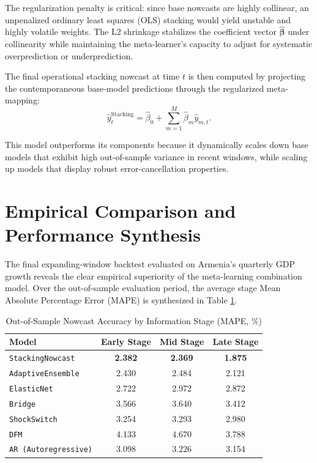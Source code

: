 \documentclass[12pt,a4paper]{article}
\begin{document}
The regularization penalty is critical: since base nowcasts are highly collinear, an unpenalized ordinary least squares (OLS) stacking would yield unstable and highly volatile weights. The L2 shrinkage stabilizes the coefficient vector $\hat{\bm{\beta}}$ under collinearity while maintaining the meta-learner's capacity to adjust for systematic overprediction or underprediction.

The final operational stacking nowcast at time $t$ is then computed by projecting the contemporaneous base-model predictions through the regularized meta-mapping:
\begin{equation}
    \hat{y}_{t}^{\text{Stacking}} = \hat{\beta}_0 + \sum_{m=1}^{M} \hat{\beta}_m \hat{y}_{m,t}.
\end{equation}

This model outperforms its components because it dynamically scales down base models that exhibit high out-of-sample variance in recent windows, while scaling up models that display robust error-cancellation properties.

\section{Empirical Comparison and Performance Synthesis}

The final expanding-window backtest evaluated on Armenia's quarterly GDP growth reveals the clear empirical superiority of the meta-learning combination model. Over the out-of-sample evaluation period, the average stage Mean Absolute Percentage Error (MAPE) is synthesized in Table \ref{tab:mape_comparison}.

\begin{table}[h]
    \centering
    \caption{Out-of-Sample Nowcast Accuracy by Information Stage (MAPE, \%)}
    \label{tab:mape_comparison}
    \begin{tabular}{lccc}
        \toprule
        Model & Early Stage & Mid Stage & Late Stage \\
        \midrule
        \texttt{StackingNowcast} & \textbf{2.382} & \textbf{2.369} & \textbf{1.875} \\
        \texttt{AdaptiveEnsemble} & 2.430 & 2.484 & 2.121 \\
        \texttt{ElasticNet} & 2.722 & 2.972 & 2.872 \\
        \texttt{Bridge} & 3.566 & 3.640 & 3.412 \\
        \texttt{ShockSwitch} & 3.254 & 3.293 & 2.980 \\
        \texttt{DFM} & 4.133 & 4.670 & 3.788 \\
        \texttt{AR (Autoregressive)} & 3.098 & 3.226 & 3.154 \\
        \bottomrule
    \end{tabular}
\end{table}
\end{document}
